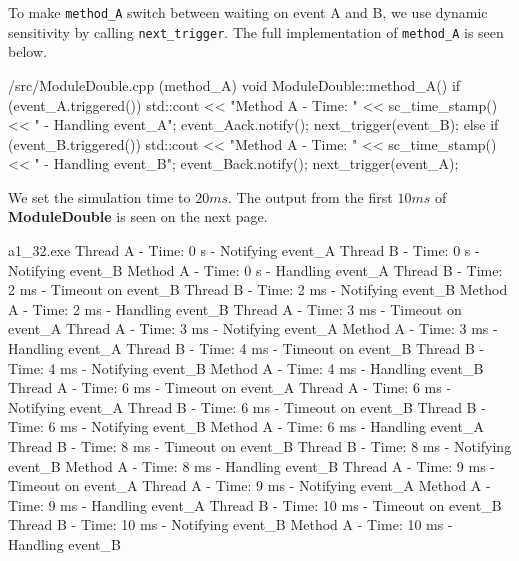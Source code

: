 \documentclass[../main.tex]{subfiles}
\begin{document}
To make \texttt{method\_A} switch between waiting on event A and B, we use dynamic sensitivity by calling \texttt{next\_trigger}. The full implementation of \texttt{method\_A} is seen below.

\begin{myminted}{/src/ModuleDouble.cpp (method\_A)}
void ModuleDouble::method_A() {
    if (event_A.triggered()) {
        std::cout << "Method A - Time: " << sc_time_stamp() << " - Handling event_A\n";
        event_Aack.notify();
        next_trigger(event_B);
    }
    else if (event_B.triggered()) {
        std::cout << "Method A - Time: " << sc_time_stamp() << " - Handling event_B\n";
        event_Back.notify();
        next_trigger(event_A);
    }
}
\end{myminted}

We set the simulation time to $20 \si{ms}$. The output from the first $10 \si{ms}$ of \textbf{ModuleDouble} is seen on the next page.

\newpage

\begin{mintedterminal}{a1\_32.exe}
Thread A - Time: 0 s - Notifying event_A
Thread B - Time: 0 s - Notifying event_B
Method A - Time: 0 s - Handling event_A
Thread B - Time: 2 ms - Timeout on event_B
Thread B - Time: 2 ms - Notifying event_B
Method A - Time: 2 ms - Handling event_B
Thread A - Time: 3 ms - Timeout on event_A
Thread A - Time: 3 ms - Notifying event_A
Method A - Time: 3 ms - Handling event_A
Thread B - Time: 4 ms - Timeout on event_B
Thread B - Time: 4 ms - Notifying event_B
Method A - Time: 4 ms - Handling event_B
Thread A - Time: 6 ms - Timeout on event_A
Thread A - Time: 6 ms - Notifying event_A
Thread B - Time: 6 ms - Timeout on event_B
Thread B - Time: 6 ms - Notifying event_B
Method A - Time: 6 ms - Handling event_A
Thread B - Time: 8 ms - Timeout on event_B
Thread B - Time: 8 ms - Notifying event_B
Method A - Time: 8 ms - Handling event_B
Thread A - Time: 9 ms - Timeout on event_A
Thread A - Time: 9 ms - Notifying event_A
Method A - Time: 9 ms - Handling event_A
Thread B - Time: 10 ms - Timeout on event_B
Thread B - Time: 10 ms - Notifying event_B
Method A - Time: 10 ms - Handling event_B
\end{mintedterminal}
\end{document}
